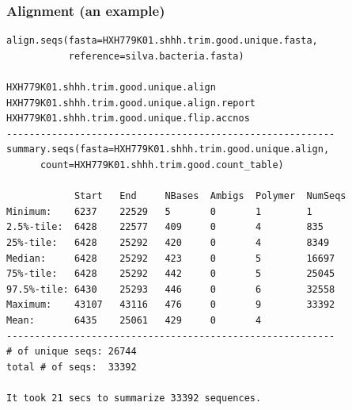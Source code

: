 \documentclass[10pt]{beamer}
\begin{document}
\begin{frame}[fragile]
  \frametitle{Alignment (an example)}
{\footnotesize{}\ttfamily\begin{verbatim}
align.seqs(fasta=HXH779K01.shhh.trim.good.unique.fasta,
           reference=silva.bacteria.fasta)

HXH779K01.shhh.trim.good.unique.align
HXH779K01.shhh.trim.good.unique.align.report
HXH779K01.shhh.trim.good.unique.flip.accnos
----------------------------------------------------------
summary.seqs(fasta=HXH779K01.shhh.trim.good.unique.align,
      count=HXH779K01.shhh.trim.good.count_table)

            Start   End     NBases  Ambigs  Polymer  NumSeqs
Minimum:    6237    22529   5       0       1        1
2.5%-tile:  6428    22577   409     0       4        835
25%-tile:   6428    25292   420     0       4        8349
Median:     6428    25292   423     0       5        16697
75%-tile:   6428    25292   442     0       5        25045
97.5%-tile: 6430    25293   446     0       6        32558
Maximum:    43107   43116   476     0       9        33392
Mean:       6435    25061   429     0       4
----------------------------------------------------------
# of unique seqs: 26744
total # of seqs:  33392

It took 21 secs to summarize 33392 sequences.
\end{verbatim}}
\end{frame}
\end{document}
